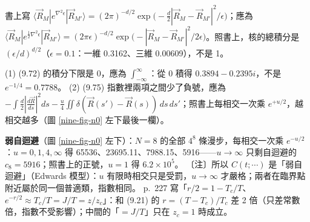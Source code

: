 \begin{errbox}[p.~225，(9.70)]
書上寫 $\langle\vec R_M|e^{\nabla^2\epsilon}|\vec R_{M'}\rangle=(2\pi)^{-d/2}\exp\big(-\frac d2|\vec R_M-\vec R_{M'}|^2/\epsilon\big)$；應為
$\langle\vec R_M|e^{\frac12\nabla^2\epsilon}|\vec R_{M'}\rangle=(2\pi\epsilon)^{-d/2}\exp\big(-|\vec R_M-\vec R_{M'}|^2/2\epsilon\big)$。照書上，核的總積分是 $(\epsilon/d)^{d/2}$（$\epsilon=0.1$：一維 0.3162、三維 0.00609），不是 1。
\end{errbox}
\begin{errbox}[p.~226，(9.72)(9.75)]
(1) (9.72) 的積分下限是 0，應為 $\int_{-\infty}^\infty$：從 0 積得 $0.3894-0.2395i$，不是 $e^{-1/4}=0.7788$。
(2) (9.75) 指數裡兩項之間少了負號，應為 $-\int\frac d2|\frac{d\vec R}{ds}|^2ds-\frac u4\iint\delta(\vec R(s')-\vec R(s))\,ds\,ds'$；照書上每相交一次乘 $e^{+u/2}$，越相交越多（圖 \ref{nine-fig-n0} 左下最後一欄）。
\end{errbox}

\textbf{弱自迴避}（圖 \ref{nine-fig-n0} 左下）：$N=8$ 的全部 $4^8$ 條漫步，每相交一次乘 $e^{-u/2}$：$u=0,1,4,\infty$ 得 65536、23695.11、7988.15、5916——$u\to\infty$ 只剩自迴避的 $c_8=5916$；照書上的正號，$u=1$ 得 $6.2\times10^5$。
〔注〕所以 $C(t;\cdots)$ 是「弱自迴避」（Edwards 模型）：$u$ 有限時相交只是受罰，$u\to\infty$ 才嚴格；兩者在臨界點附近屬於同一個普適類，指數相同。
p.~227 寫「$r/2=1-T_c/T$、$e^{-r/2}\approx T_c/T=J/T=z/z_c$」：和 (9.21) 的 $r=(T-T_c)/T_c$ 差 2 倍（只差常數倍，指數不受影響）；中間的「$=J/T$」只在 $z_c=1$ 時成立。

